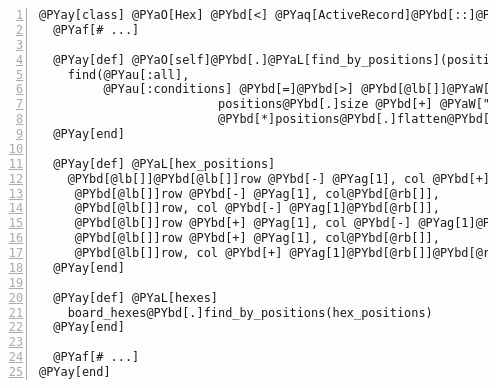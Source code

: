 \begin{Verbatim}[commandchars=@\[\],numbers=left,firstnumber=1,stepnumber=1]
@PYay[class] @PYaO[Hex] @PYbd[<] @PYaq[ActiveRecord]@PYbd[::]@PYaq[Base]
  @PYaf[# ...]

  @PYay[def] @PYaO[self]@PYbd[.]@PYaL[find_by_positions](positions)
    find(@PYau[:all],
         @PYau[:conditions] @PYbd[=]@PYbd[>] @PYbd[@lb[]]@PYaW["]@PYaW[(hexes.row = ? AND hexes.col = ?) OR ]@PYaW["] @PYbd[*]
                         positions@PYbd[.]size @PYbd[+] @PYaW["]@PYaW[ 0 = 1]@PYaW["],
                         @PYbd[*]positions@PYbd[.]flatten@PYbd[@rb[]])
  @PYay[end]

  @PYay[def] @PYaL[hex_positions]
    @PYbd[@lb[]]@PYbd[@lb[]]row @PYbd[-] @PYag[1], col @PYbd[+] @PYag[1]@PYbd[@rb[]],
     @PYbd[@lb[]]row @PYbd[-] @PYag[1], col@PYbd[@rb[]],
     @PYbd[@lb[]]row, col @PYbd[-] @PYag[1]@PYbd[@rb[]],
     @PYbd[@lb[]]row @PYbd[+] @PYag[1], col @PYbd[-] @PYag[1]@PYbd[@rb[]],
     @PYbd[@lb[]]row @PYbd[+] @PYag[1], col@PYbd[@rb[]],
     @PYbd[@lb[]]row, col @PYbd[+] @PYag[1]@PYbd[@rb[]]@PYbd[@rb[]]
  @PYay[end]

  @PYay[def] @PYaL[hexes]
    board_hexes@PYbd[.]find_by_positions(hex_positions)
  @PYay[end]

  @PYaf[# ...]
@PYay[end]
\end{Verbatim}
